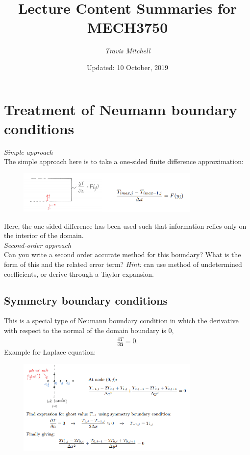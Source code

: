 \documentclass[11pt,a4paper]{report}
\author{\textit{Travis Mitchell}}
\title{Lecture Content Summaries for MECH3750}
\date{Updated: 10 October, 2019}
\theoremstyle{definition}
\begin{document}
\section{Treatment of Neumann boundary conditions}
\textit{Simple approach} \\
The simple approach here is to take a one-sided finite difference approximation:
\begin{figure}[!h]
	\centering
	\includegraphics[width=0.8\textwidth]{onesided.png}
\end{figure}
Here, the one-sided difference has been used such that information relies only on the interior of the domain. \\

\textit{Second-order approach}\\
Can you write a second order accurate method for this boundary? What is the form of this and the related error term? \textit{Hint:} can use method of undetermined coefficients, or derive through a Taylor expansion.

\subsection{Symmetry boundary conditions}
This is a special type of Neumann boundary condition in which the derivative with respect to the normal of the domain boundary is 0, 
\begin{align*}
	\frac{\partial T}{\partial \mathbf{n}} = 0.
\end{align*}
Example for Laplace equation:
\begin{figure}[!h]
	\centering
	\includegraphics[width=0.8\textwidth]{symmetry.png}
\end{figure}
\end{document}
